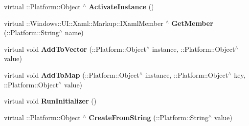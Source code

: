 \begin{DoxyCompactItemize}
\mbox{\label{class_xaml_type_info_1_1_info_provider_1_1_xaml_system_base_type_aeefbd7181260daebb31bb4decbd88268}} 
virtual \+::Platform\+::\+Object $^\wedge$ {\bfseries Activate\+Instance} ()
\item 
\mbox{\label{class_xaml_type_info_1_1_info_provider_1_1_xaml_system_base_type_a694b9a55328fc1f366af9166e95423c0}} 
virtual \+::Windows\+::\+U\+I\+::\+Xaml\+::\+Markup\+::\+I\+Xaml\+Member $^\wedge$ {\bfseries Get\+Member} (\+::Platform\+::\+String$^\wedge$ name)
\item 
\mbox{\label{class_xaml_type_info_1_1_info_provider_1_1_xaml_system_base_type_aaafca3b7939450d02d74df7fa930c623}} 
virtual void {\bfseries Add\+To\+Vector} (\+::Platform\+::\+Object$^\wedge$ instance, \+::Platform\+::\+Object$^\wedge$ value)
\item 
\mbox{\label{class_xaml_type_info_1_1_info_provider_1_1_xaml_system_base_type_a96244e1a7ed8813253abac0b606a68c6}} 
virtual void {\bfseries Add\+To\+Map} (\+::Platform\+::\+Object$^\wedge$ instance, \+::Platform\+::\+Object$^\wedge$ key, \+::Platform\+::\+Object$^\wedge$ value)
\item 
\mbox{\label{class_xaml_type_info_1_1_info_provider_1_1_xaml_system_base_type_a622f1311cdaa7761b778a59e931c7420}} 
virtual void {\bfseries Run\+Initializer} ()
\item 
\mbox{\label{class_xaml_type_info_1_1_info_provider_1_1_xaml_system_base_type_abb6dc9e86056b271c2b3ab9381b1fb84}} 
virtual \+::Platform\+::\+Object $^\wedge$ {\bfseries Create\+From\+String} (\+::Platform\+::\+String$^\wedge$ value)
\end{DoxyCompactItemize}
